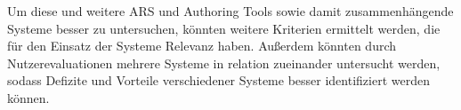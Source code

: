 \documentclass[conference]{IEEEtran}
\begin{document}
Um diese und weitere ARS und Authoring Tools sowie damit zusammenhängende Systeme besser zu untersuchen, könnten weitere Kriterien ermittelt werden, die für den Einsatz der Systeme Relevanz haben. Außerdem könnten durch Nutzerevaluationen mehrere Systeme in relation zueinander untersucht werden, sodass Defizite und Vorteile verschiedener Systeme besser identifiziert werden können.

\renewcommand{\refname}{Referenzen}





%
%
\end{document}

